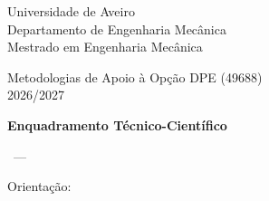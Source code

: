 
\begin{titlepage}
\centering
{\large Universidade de Aveiro\\ Departamento de Engenharia Mecânica\\ Mestrado em Engenharia Mecânica\par}
\vspace{1cm}
{\large Metodologias de Apoio à Opção DPE (49688)\\ 2026/2027\par}
\vfill
{\color{azul}\LARGE\bfseries Enquadramento Técnico-Científico\par}
\vspace{1cm}
{\Large\bfseries\tituloPT\par}
\medskip
{\large\tituloEN\par}
\medskip
{\large\tipologia\par}
\vfill
{\large\estudante\ --- \numero\par}
\medskip
Orientação: \orientadores\par
\vfill
\dataentrega
\end{titlepage}